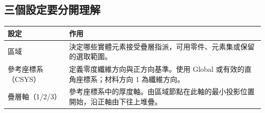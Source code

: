 \documentclass[11pt,a4paper,fontset=none]{ctexart}
\begin{document}
\subsection*{三個設定要分開理解}
\par\noindent\begin{tabularx}{\linewidth}{@{}lY@{}}\toprule
設定 & 作用 \\\midrule
區域 & 決定哪些實體元素接受疊層指派，可用零件、元素集或保留的選取範圍。 \\
參考座標系（CSYS） & 定義零度纖維方向與正方向基準。使用 Global 或有效的直角座標系；材料方向 1 為纖維方向。 \\
疊層軸（1/2/3） & 參考座標系中的厚度軸。由區域節點在此軸的最小投影位置開始，沿正軸由下往上堆疊。 \\\bottomrule
\end{tabularx}\par
\end{document}
